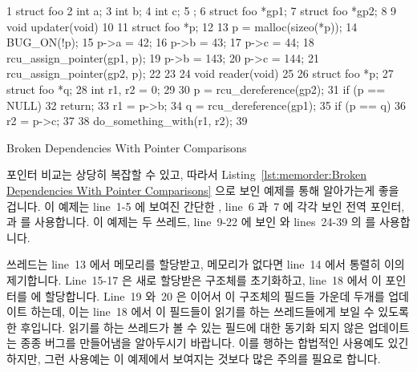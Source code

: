 \begin{listing}[tbp]
{ \scriptsize
\begin{verbbox}
 1 struct foo {
 2   int a;
 3   int b;
 4   int c;
 5 };
 6 struct foo *gp1;
 7 struct foo *gp2;
 8
 9 void updater(void)
10 {
11   struct foo *p;
12
13   p = malloc(sizeo(*p));
14   BUG_ON(!p);
15   p->a = 42;
16   p->b = 43;
17   p->c = 44;
18   rcu_assign_pointer(gp1, p);
19   p->b = 143;
20   p->c = 144;
21   rcu_assign_pointer(gp2, p);
22 }
23
24 void reader(void)
25 {
26   struct foo *p;
27   struct foo *q;
28   int r1, r2 = 0;
29
30   p = rcu_dereference(gp2);
31   if (p == NULL)
32     return;
33   r1 = p->b;
34   q = rcu_dereference(gp1);
35   if (p == q) {
36     r2 = p->c;
37   }
38   do_something_with(r1, r2);
39 }
\end{verbbox}
}
\centering
\theverbbox
\caption{Broken Dependencies With Pointer Comparisons}
\label{lst:memorder:Broken Dependencies With Pointer Comparisons}
\end{listing}

포인터 비교는 상당히 복잡할 수 있고, 따라서
Listing~\ref{lst:memorder:Broken Dependencies With Pointer Comparisons}
으로 보인 예제를 통해 알아가는게 좋을 겁니다.
이 예제는 line~1-5 에 보여진 간단한 , line~6 과~7 에 각각 보인
전역 포인터,  과  를 사용합니다.
이 예제는 두 쓰레드, line~9-22 에 보인  와 lines~24-39 의
 를 사용합니다.

 쓰레드는 line~13 에서 메모리를 할당받고, 메모리가 없다면 line~14
에서 통렬히 이의 제기합니다.
Line~15-17 은 새로 할당받은 구조체를 초기화하고, line~18 에서 이 포인터를
 에 할당합니다.
Line~19 와~20 은 이어서 이 구조체의 필드들 가운데 두개를 업데이트 하는데, 이는
line~18 에서 이 필드들이 읽기를 하는 쓰레드들에게 보일 수 있도록 한 후입니다.
읽기를 하는 쓰레드가 볼 수 있는 필드에 대한 동기화 되지 않은 업데이트는 종종
버그를 만들어냄을 알아두시기 바랍니다.
이를 행하는 합법적인 사용예도 있긴 하지만, 그런 사용예는 이 예제에서 보여지는
것보다 많은 주의를 필요로 합니다.

